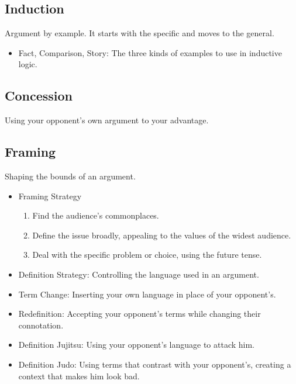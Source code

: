\subsection{Induction}
Argument by example. It starts with the specific and moves to the general. 

\begin{itemize}
	\item Fact, Comparison, Story: The three kinds of examples to use in inductive logic.
\end{itemize}

\subsection{Concession}
Using your opponent's own argument to your advantage.

\subsection{Framing}
Shaping the bounds of an argument. 

\begin{itemize}
	\item Framing Strategy
		\begin{enumerate}
			\item Find the audience's commonplaces.
			\item Define the issue broadly, appealing to the values of the widest audience.
			\item Deal with the specific problem or choice, using the future tense.
		\end{enumerate}
	\item Definition Strategy: Controlling the language used in an argument.
	\item Term Change: Inserting your own language in place of your opponent's.
	\item Redefinition: Accepting your opponent's terms while changing their connotation.
	\item Definition Jujitsu: Using your opponent's language to attack him.
	\item Definition Judo: Using terms that contrast with your opponent's, creating a context that makes him look bad.
\end{itemize}

